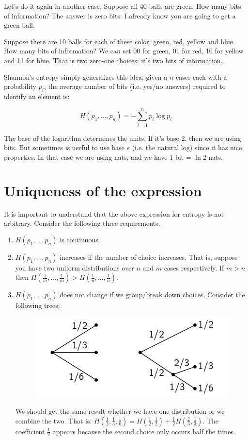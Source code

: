 \documentclass[aps,pra,10pt,floatfix,nofootinbib]{revtex4-1}
\theoremstyle{definition}
\begin{document}
Let's do it again in another case. Suppose all 40 balls are green. How many bits of information? The answer is zero bits: I already know you are going to get a green ball.

Suppose there are 10 balls for each of these color: green, red, yellow and blue. How many bits of information? We can set 00 for green, 01 for red, 10 for yellow and 11 for blue. That is two zero-one choices: it's two bits of information.

Shannon's entropy simply generalizes this idea: given a $n$ cases each with a probability $p_i$, the average number of bits (i.e. yes/no answers) required to identify an element is:

\begin{equation}
\label{ShannonEntropy}
H(p_1, ..., p_n) = - \sum_{i=1}^{n} p_i \log p_i
\end{equation}

The base of the logarithm determines the units. If it's base $2$, then we are using bits. But sometimes is useful to use base $e$ (i.e. the natural log) since it has nice properties. In that case we are using nats, and we have $1$ bit = $\ln 2$ nats.

\section{Uniqueness of the expression}

It is important to understand that the above expression for entropy is not arbitrary. Consider the following three requirements.

\begin{enumerate}
	\item $H(p_1, ..., p_n)$ is continuous.
	\item $H(p_1, ..., p_n)$ increases if the number of choice increases. That is, suppose you have two uniform distributions over $n$ and $m$ cases respectively. If $m>n$ then $H(\frac{1}{m}, ..., \frac{1}{m})>H(\frac{1}{n}, ..., \frac{1}{n})$.
	\item $H(p_1, ..., p_n)$ does not change if we group/break down choices. Consider the following trees:
	\begin{figure}[h]
	\includegraphics[scale=0.50]{ShannonTree}
	\centering
	\end{figure}
	
	We should get the same result whether we have one distribution or we combine the two. That is: $H(\frac{1}{2}, \frac{1}{3}, \frac{1}{6}) = H(\frac{1}{2},\frac{1}{2}) + \frac{1}{2} H(\frac{2}{3}, \frac{1}{3})$. The coefficient $\frac{1}{2}$ appears because the second choice only occurs half the times.
\end{enumerate}
\end{document}
